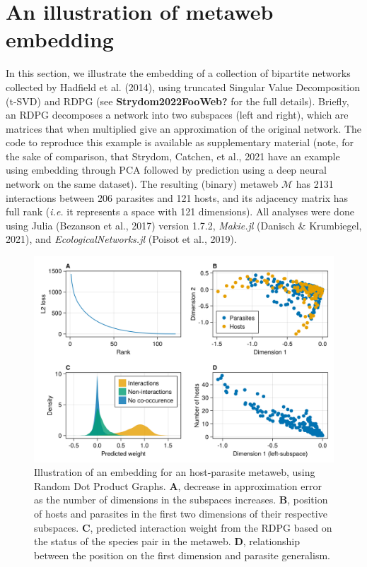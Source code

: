 \documentclass[10pt,oneside]{article}
\makeatletter
\def\maxwidth{\ifdim\Gin@nat@width>\linewidth\linewidth
\else\Gin@nat@width\fi}
\let\Oldincludegraphics\includegraphics
\renewcommand{\includegraphics}[1]{\Oldincludegraphics[width=\maxwidth]{#1}}
\makeatother
\begin{document}
\hypertarget{an-illustration-of-metaweb-embedding}{%
\section{An illustration of metaweb
embedding}\label{an-illustration-of-metaweb-embedding}}

In this section, we illustrate the embedding of a collection of
bipartite networks collected by Hadfield et al. (2014), using truncated
Singular Value Decomposition (t-SVD) and RDPG (see
\textbf{Strydom2022FooWeb?} for the full details). Briefly, an RDPG
decomposes a network into two subspaces (left and right), which are
matrices that when multiplied give an approximation of the original
network. The code to reproduce this example is available as
supplementary material (note, for the sake of comparison, that Strydom,
Catchen, et al., 2021 have an example using embedding through PCA
followed by prediction using a deep neural network on the same dataset).
The resulting (binary) metaweb \(\mathcal{M}\) has 2131 interactions
between 206 parasites and 121 hosts, and its adjacency matrix has full
rank (\emph{i.e.} it represents a space with 121 dimensions). All
analyses were done using Julia (Bezanson et al., 2017) version 1.7.2,
\emph{Makie.jl} (Danisch \& Krumbiegel, 2021), and
\emph{EcologicalNetworks.jl} (Poisot et al., 2019).

\begin{figure}
\hypertarget{fig:illustration}{%
\centering
\includegraphics{figures/illustration.png}
\caption{Illustration of an embedding for an host-parasite metaweb,
using Random Dot Product Graphs. \textbf{A}, decrease in approximation
error as the number of dimensions in the subspaces increases.
\textbf{B}, position of hosts and parasites in the first two dimensions
of their respective subspaces. \textbf{C}, predicted interaction weight
from the RDPG based on the status of the species pair in the metaweb.
\textbf{D}, relationship between the position on the first dimension and
parasite generalism.}\label{fig:illustration}
}
\end{figure}
\end{document}
